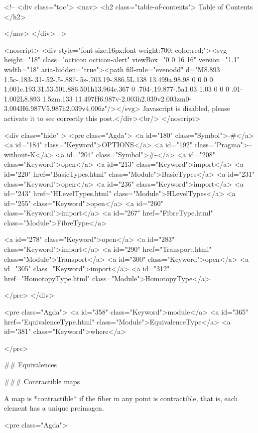   <!-- 
  <div class="toc">
    <nav>
    <h2 class="table-of-contents"> Table of Contents </h2>
      

    </nav>
  </div>
   -->

  <noscript>
  <div style="font-size:16px;font-weight:700; color:red;"><svg height="18" class="octicon octicon-alert" viewBox="0 0 16 16" version="1.1" width="18" aria-hidden="true"><path fill-rule="evenodd" d="M8.893 1.5c-.183-.31-.52-.5-.887-.5s-.703.19-.886.5L.138 13.499a.98.98 0 0 0 0 1.001c.193.31.53.501.886.501h13.964c.367 0 .704-.19.877-.5a1.03 1.03 0 0 0 .01-1.002L8.893 1.5zm.133 11.497H6.987v-2.003h2.039v2.003zm0-3.004H6.987V5.987h2.039v4.006z"/></svg> Javascript is disabled, please activate it to see correctly this post.</div><br/>
  </noscript>

  <div class="hide" >
<pre class="Agda">
<a id="180" class="Symbol">{-#</a> <a id="184" class="Keyword">OPTIONS</a> <a id="192" class="Pragma">--without-K</a> <a id="204" class="Symbol">#-}</a>
<a id="208" class="Keyword">open</a> <a id="213" class="Keyword">import</a> <a id="220" href="BasicTypes.html" class="Module">BasicTypes</a>
<a id="231" class="Keyword">open</a> <a id="236" class="Keyword">import</a> <a id="243" href="HLevelTypes.html" class="Module">HLevelTypes</a>
<a id="255" class="Keyword">open</a> <a id="260" class="Keyword">import</a> <a id="267" href="FibreType.html" class="Module">FibreType</a>

<a id="278" class="Keyword">open</a> <a id="283" class="Keyword">import</a> <a id="290" href="Transport.html" class="Module">Transport</a>
<a id="300" class="Keyword">open</a> <a id="305" class="Keyword">import</a> <a id="312" href="HomotopyType.html" class="Module">HomotopyType</a>

</pre>
</div>

<pre class="Agda">
<a id="358" class="Keyword">module</a> <a id="365" href="EquivalenceType.html" class="Module">EquivalenceType</a> <a id="381" class="Keyword">where</a>

</pre>

## Equivalences

### Contractible maps

A map is *contractible* if the fiber in any point is contractible, that is, each
element has a unique preimagen.

<pre class="Agda">

